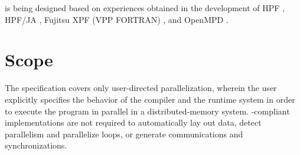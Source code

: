 \begin{itemize}
%
%
%
%
%

\end{itemize}

{\XMP} is being designed based on experiences obtained in the
development of HPF \cite{hpf}, HPF/JA \cite{hpfja}, Fujitsu XPF (VPP
FORTRAN) \cite{XPF,VPPFORTRAN}, and OpenMPD \cite{OpenMPD}.

\section{Scope}

The {\XMP} specification covers only user-directed parallelization,
wherein the user explicitly specifies the behavior of the compiler and
the runtime system in order to execute the program in parallel in a
distributed-memory system.
%
{\XMP}-compliant implementations are not required to automatically
lay out data, detect parallelism and parallelize loops, or generate
communications and synchronizations.

%


